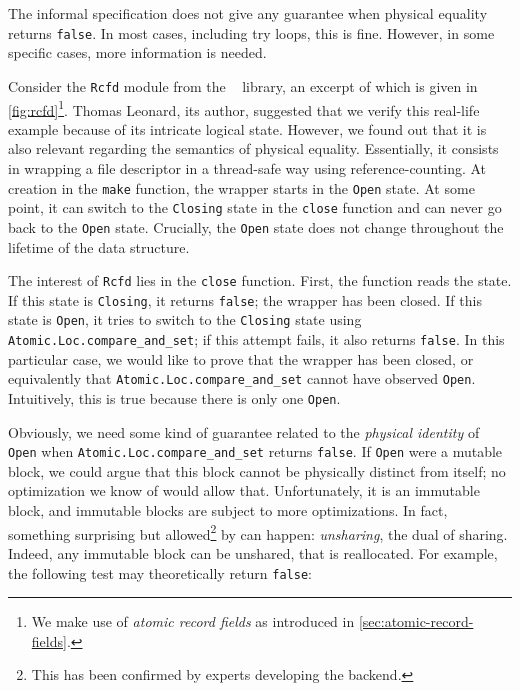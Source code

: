 

The informal \OCaml specification does not give any guarantee when physical equality returns \texttt{false}.
In most cases, including try loops, this is fine.
However, in some specific cases, more information is needed.

Consider the \texttt{Rcfd} module from the \Eio~\cite{eio} library, an excerpt of which is given in \cref{fig:rcfd}\footnote{We make use of \emph{atomic record fields} as introduced in \cref{sec:atomic-record-fields}.}.
Thomas Leonard, its author, suggested that we verify this real-life example because of its intricate logical state.
However, we found out that it is also relevant regarding the semantics of physical equality.
Essentially, it consists in wrapping a file descriptor in a thread-safe way using reference-counting.
At creation in the \texttt{make} function, the wrapper starts in the \texttt{Open} state.
At some point, it can switch to the \texttt{Closing} state in the \texttt{close} function and can never go back to the \texttt{Open} state.
Crucially, the \texttt{Open} state does not change throughout the lifetime of the data structure.

The interest of \texttt{Rcfd} lies in the \texttt{close} function.
First, the function reads the state.
If this state is \texttt{Closing}, it returns \texttt{false}; the wrapper has been closed.
If this state is \texttt{Open}, it tries to switch to the \texttt{Closing} state using \texttt{Atomic.Loc.compare_and_set}; if this attempt fails, it also returns \texttt{false}.
In this particular case, we would like to prove that the wrapper has been closed, or equivalently that \texttt{Atomic.Loc.compare_and_set} cannot have observed \texttt{Open}.
Intuitively, this is true because there is only one \texttt{Open}.

Obviously, we need some kind of guarantee related to the \emph{physical identity} of \texttt{Open} when \texttt{Atomic.Loc.compare_and_set} returns \texttt{false}.
If \texttt{Open} were a mutable block, we could argue that this block cannot be physically distinct from itself; no optimization we know of would allow that.
Unfortunately, it is an immutable block, and immutable blocks are subject to more optimizations.
In fact, something surprising but allowed\footnote{This has been confirmed by \OCaml experts developing the \Flambda backend.} by \OCaml can happen: \emph{unsharing}, the dual of sharing.
Indeed, any immutable block can be unshared, that is reallocated.
For example, the following test may theoretically return \texttt{false}:

